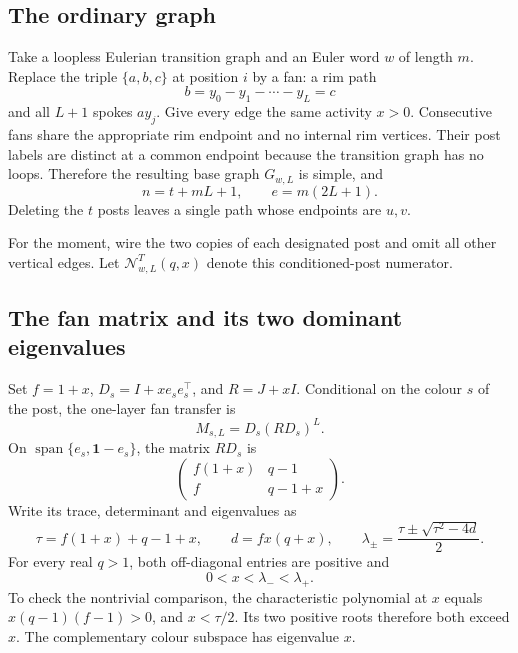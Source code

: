 \documentclass[11pt,a4paper]{article}
\theoremstyle{remark}\newtheorem{remark}[theorem]{Remark}
\newcommand{\one}{\mathbf 1}\newcommand{\N}{\mathcal N}
\begin{document}
\subsection{The ordinary graph}
Take a loopless Eulerian transition graph and an Euler word $w$ of length $m$. Replace the triple $\{a,b,c\}$ at position $i$ by a fan: a rim path
\[
b=y_0-y_1-\cdots-y_L=c
\]
and all $L+1$ spokes $ay_j$. Give every edge the same activity $x>0$. Consecutive fans share the appropriate rim endpoint and no internal rim vertices. Their post labels are distinct at a common endpoint because the transition graph has no loops. Therefore the resulting base graph $G_{w,L}$ is simple, and
\begin{equation}\label{eq:corecounts}
n=t+mL+1,\qquad e=m(2L+1).
\end{equation}
Deleting the $t$ posts leaves a single path whose endpoints are $u,v$.

For the moment, wire the two copies of each designated post and omit all other vertical edges. Let $\N_{w,L}^{T}(q,x)$ denote this conditioned-post numerator.

\subsection{The fan matrix and its two dominant eigenvalues}
Set $f=1+x$, $D_s=I+xe_se_s^\top$, and $R=J+xI$. Conditional on the colour $s$ of the post, the one-layer fan transfer is
\begin{equation}\label{eq:fan}
M_{s,L}=D_s(RD_s)^L.
\end{equation}
On $\operatorname{span}\{e_s,\one-e_s\}$, the matrix $RD_s$ is
\[
\begin{pmatrix}f(1+x)&q-1\\ f&q-1+x\end{pmatrix}.
\]
Write its trace, determinant and eigenvalues as
\begin{equation}\label{eq:eigen}
\tau=f(1+x)+q-1+x,\qquad d=fx(q+x),\qquad
\lambda_\pm=\frac{\tau\pm\sqrt{\tau^2-4d}}2.
\end{equation}
For every real $q>1$, both off-diagonal entries are positive and
\begin{equation}\label{eq:ordering}
0<x<\lambda_-<\lambda_+.
\end{equation}
To check the nontrivial comparison, the characteristic polynomial at $x$ equals
$x(q-1)(f-1)>0$, and $x<\tau/2$. Its two positive roots therefore both exceed $x$.
The complementary colour subspace has eigenvalue $x$.
\end{document}
